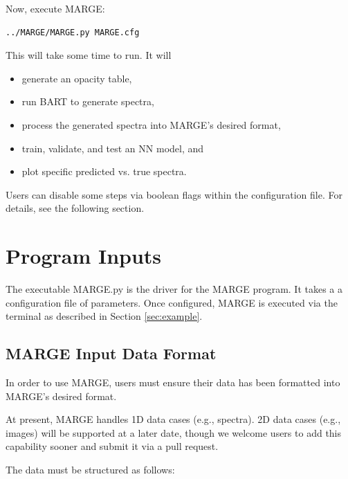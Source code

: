 \documentclass[letterpaper, 12pt]{article}
\begin{document}
\noindent Now, execute MARGE:
\begin{verbatim}
../MARGE/MARGE.py MARGE.cfg
\end{verbatim}

\noindent This will take some time to run.  It will 

\begin{itemize}
\item generate an opacity table,
\item run BART to generate spectra,
\item process the generated spectra into MARGE's desired format,
\item train, validate, and test an NN model, and
\item plot specific predicted vs. true spectra.
\end{itemize}

\noindent Users can disable some steps via boolean flags within the configuration file.  
For details, see the following section.


\section{Program Inputs}
\label{sec:inputs}

The executable MARGE.py is the driver for the MARGE program. It takes a 
a configuration file of parameters.  Once configured, MARGE is executed via 
the terminal as described in Section \ref{sec:example}.


\subsection{MARGE Input Data Format}
In order to use MARGE, users must ensure their data has been formatted into 
MARGE's desired format.\newline

\noindent At present, MARGE handles 1D data cases (e.g., spectra).  2D data 
cases (e.g., images) will be supported at a later date, though we welcome users 
to add this capability sooner and submit it via a pull request.\newline

\noindent The data must be structured as follows:
\noindent{}
\vspace{0.7cm}
\end{document}
